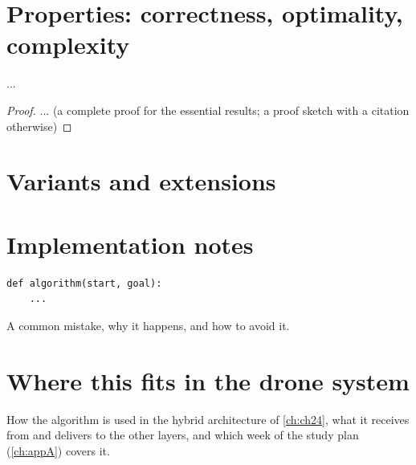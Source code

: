 \section{Properties: correctness, optimality, complexity}
\label{sec:chNN-properties}
\begin{theorem}[Name]
\label{thm:chNN-name}
...
\end{theorem}
\begin{proof}
... (a complete proof for the essential results; a proof sketch with a citation otherwise)
\end{proof}

\section{Variants and extensions}
\label{sec:chNN-variants}

\section{Implementation notes}
\label{sec:chNN-implementation}
\begin{lstlisting}[caption={Core of the implementation (from \code{code/chNN\_slug.py}).},label={lst:chNN-core}]
def algorithm(start, goal):
    ...
\end{lstlisting}

\begin{pitfall}
A common mistake, why it happens, and how to avoid it.
\end{pitfall}

\section{Where this fits in the drone system}
\label{sec:chNN-drone}
\begin{dronebox}
How the algorithm is used in the hybrid architecture of \cref{ch:ch24}, what it
receives from and delivers to the other layers, and which week of the study plan
(\cref{ch:appA}) covers it.
\end{dronebox}

